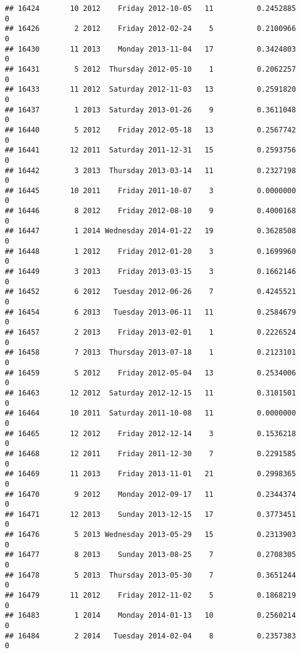 \documentclass[
]{article}
\begin{document}
\begin{verbatim}
## 16424       10 2012    Friday 2012-10-05   11          0.2452885             0
## 16426        2 2012    Friday 2012-02-24    5          0.2100966             0
## 16430       11 2013    Monday 2013-11-04   17          0.3424803             0
## 16431        5 2012  Thursday 2012-05-10    1          0.2062257             0
## 16433       11 2012  Saturday 2012-11-03   13          0.2591820             0
## 16437        1 2013  Saturday 2013-01-26    9          0.3611048             0
## 16440        5 2012    Friday 2012-05-18   13          0.2567742             0
## 16441       12 2011  Saturday 2011-12-31   15          0.2593756             0
## 16442        3 2013  Thursday 2013-03-14   11          0.2327198             0
## 16445       10 2011    Friday 2011-10-07    3          0.0000000             0
## 16446        8 2012    Friday 2012-08-10    9          0.4000168             0
## 16447        1 2014 Wednesday 2014-01-22   19          0.3628508             0
## 16448        1 2012    Friday 2012-01-20    3          0.1699960             0
## 16449        3 2013    Friday 2013-03-15    3          0.1662146             0
## 16452        6 2012   Tuesday 2012-06-26    7          0.4245521             0
## 16454        6 2013   Tuesday 2013-06-11   11          0.2584679             0
## 16457        2 2013    Friday 2013-02-01    1          0.2226524             0
## 16458        7 2013  Thursday 2013-07-18    1          0.2123101             0
## 16459        5 2012    Friday 2012-05-04   13          0.2534006             0
## 16463       12 2012  Saturday 2012-12-15   11          0.3101501             0
## 16464       10 2011  Saturday 2011-10-08   11          0.0000000             0
## 16465       12 2012    Friday 2012-12-14    3          0.1536218             0
## 16468       12 2011    Friday 2011-12-30    7          0.2291585             0
## 16469       11 2013    Friday 2013-11-01   21          0.2998365             0
## 16470        9 2012    Monday 2012-09-17   11          0.2344374             0
## 16471       12 2013    Sunday 2013-12-15   17          0.3773451             0
## 16476        5 2013 Wednesday 2013-05-29   15          0.2313903             0
## 16477        8 2013    Sunday 2013-08-25    7          0.2708305             0
## 16478        5 2013  Thursday 2013-05-30    7          0.3651244             0
## 16479       11 2012    Friday 2012-11-02    5          0.1868219             0
## 16483        1 2014    Monday 2014-01-13   10          0.2560214             0
## 16484        2 2014   Tuesday 2014-02-04    8          0.2357383             0

\end{verbatim}
\end{document}
